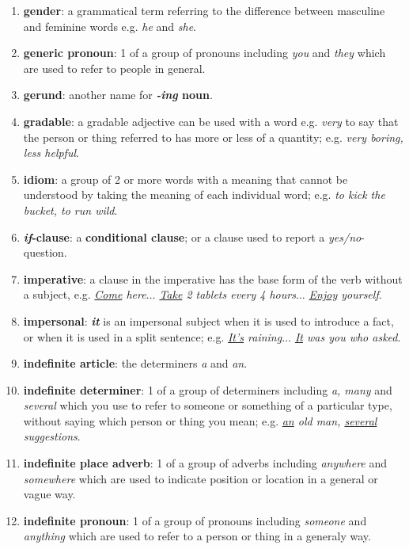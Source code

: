 \documentclass[oneside]{book}
\numberwithin{equation}{section}
\begin{document}
\begin{enumerate}
    Also called \textbf{future perfect continuous}.
    \item \textbf{gender}: a grammatical term referring to the difference between masculine and feminine words e.g. \textit{he} and \textit{she}.
    \item \textbf{generic pronoun}: 1 of a group of pronouns including \textit{you} and \textit{they} which are used to refer to people in general.
    \item \textbf{gerund}: another name for \textbf{\textit{-ing} noun}.
    \item \textbf{gradable}: a gradable adjective can be used with a word e.g. \textit{very} to say that the person or thing referred to has more or less of a quantity; e.g. \textit{very boring, less helpful}.
    \item \textbf{idiom}: a group of 2 or more words with a meaning that cannot be understood by taking the meaning of each individual word; e.g. \textit{to kick the bucket, to run wild}.
    \item \textbf{\textit{if}-clause}: a \textbf{conditional clause}; or a clause used to report a \textit{yes/no}-question.
    \item \textbf{imperative}: a clause in the imperative has the base form of the verb without a subject, e.g. \textit{\underline{Come} here$\ldots$ \underline{Take} 2 tablets every 4 hours$\ldots$ \underline{Enjoy} yourself}.
    \item \textbf{impersonal}: \textbf{\textit{it}} is an impersonal subject when it is used to introduce a fact, or when it is used in a split sentence; e.g. \textit{\underline{It's} raining$\ldots$ \underline{It} was you who asked}.
    \item \textbf{indefinite article}: the determiners \textit{a} and \textit{an}.
    \item \textbf{indefinite determiner}: 1 of a group of determiners including \textit{a, many} and \textit{several} which you use to refer to someone or something of a particular type, without saying which person or thing you mean; e.g. \textit{\underline{an} old man, \underline{several} suggestions}.
    \item \textbf{indefinite place adverb}: 1 of a group of adverbs including \textit{anywhere} and \textit{somewhere} which are used to indicate position or location in a general or vague way.
    \item \textbf{indefinite pronoun}: 1 of a group of pronouns including \textit{someone} and \textit{anything} which are used to refer to a person or thing in a generaly way.

\end{enumerate}
\end{document}
